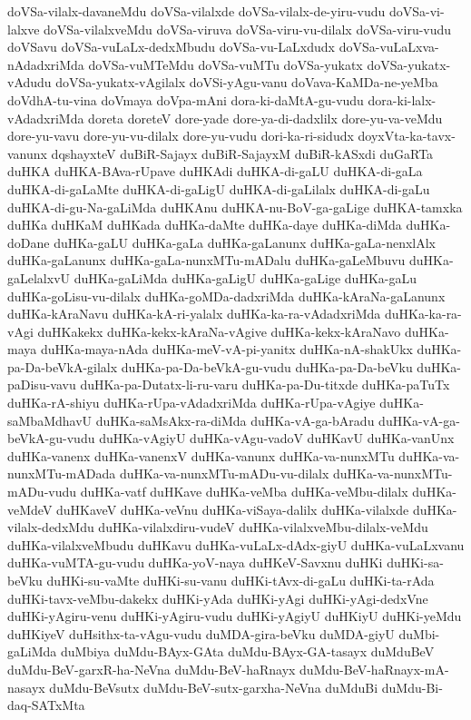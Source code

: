 {doVSa-vilalx-davaneMdu
doVSa-vilalxde
doVSa-vilalx-de-yiru-vudu
doVSa-vi-lalxve
doVSa-vilalxveMdu
doVSa-viruva
doVSa-viru-vu-dilalx
doVSa-viru-vudu
doVSavu
doVSa-vuLaLx-dedxMbudu
doVSa-vu-LaLxdudx
doVSa-vuLaLxva-nAdadxriMda
doVSa-vuMTeMdu
doVSa-vuMTu
doVSa-yukatx
doVSa-yukatx-vAdudu
doVSa-yukatx-vAgilalx
doVSi-yAgu-vanu
doVava-KaMDa-ne-yeMba
doVdhA-tu-vina
doVmaya
doVpa-mAni
dora-ki-daMtA-gu-vudu
dora-ki-lalx-vAdadxriMda
doreta
doreteV
dore-yade
dore-ya-di-dadxlilx
dore-yu-va-veMdu
dore-yu-vavu
dore-yu-vu-dilalx
dore-yu-vudu
dori-ka-ri-sidudx
doyxVta-ka-tavx-vanunx
dqshayxteV
duBiR-Sajayx
duBiR-SajayxM
duBiR-kASxdi
duGaRTa
duHKA
duHKA-BAva-rUpave
duHKAdi
duHKA-di-gaLU
duHKA-di-gaLa
duHKA-di-gaLaMte
duHKA-di-gaLigU
duHKA-di-gaLilalx
duHKA-di-gaLu
duHKA-di-gu-Na-gaLiMda
duHKAnu
duHKA-nu-BoV-ga-gaLige
duHKA-tamxka
duHKa
duHKaM
duHKada
duHKa-daMte
duHKa-daye
duHKa-diMda
duHKa-doDane
duHKa-gaLU
duHKa-gaLa
duHKa-gaLanunx
duHKa-gaLa-nenxlAlx
duHKa-gaLanunx
duHKa-gaLa-nunxMTu-mADalu
duHKa-gaLeMbuvu
duHKa-gaLelalxvU
duHKa-gaLiMda
duHKa-gaLigU
duHKa-gaLige
duHKa-gaLu
duHKa-goLisu-vu-dilalx
duHKa-goMDa-dadxriMda
duHKa-kAraNa-gaLanunx
duHKa-kAraNavu
duHKa-kA-ri-yalalx
duHKa-ka-ra-vAdadxriMda
duHKa-ka-ra-vAgi
duHKakekx
duHKa-kekx-kAraNa-vAgive
duHKa-kekx-kAraNavo
duHKa-maya
duHKa-maya-nAda
duHKa-meV-vA-pi-yanitx
duHKa-nA-shakUkx
duHKa-pa-Da-beVkA-gilalx
duHKa-pa-Da-beVkA-gu-vudu
duHKa-pa-Da-beVku
duHKa-paDisu-vavu
duHKa-pa-Dutatx-li-ru-varu
duHKa-pa-Du-titxde
duHKa-paTuTx
duHKa-rA-shiyu
duHKa-rUpa-vAdadxriMda
duHKa-rUpa-vAgiye
duHKa-saMbaMdhavU
duHKa-saMsAkx-ra-diMda
duHKa-vA-ga-bAradu
duHKa-vA-ga-beVkA-gu-vudu
duHKa-vAgiyU
duHKa-vAgu-vadoV
duHKavU
duHKa-vanUnx
duHKa-vanenx
duHKa-vanenxV
duHKa-vanunx
duHKa-va-nunxMTu
duHKa-va-nunxMTu-mADada
duHKa-va-nunxMTu-mADu-vu-dilalx
duHKa-va-nunxMTu-mADu-vudu
duHKa-vatf
duHKave
duHKa-veMba
duHKa-veMbu-dilalx
duHKa-veMdeV
duHKaveV
duHKa-veVnu
duHKa-viSaya-dalilx
duHKa-vilalxde
duHKa-vilalx-dedxMdu
duHKa-vilalxdiru-vudeV
duHKa-vilalxveMbu-dilalx-veMdu
duHKa-vilalxveMbudu
duHKavu
duHKa-vuLaLx-dAdx-giyU
duHKa-vuLaLxvanu
duHKa-vuMTA-gu-vudu
duHKa-yoV-naya
duHKeV-Savxnu
duHKi
duHKi-sa-beVku
duHKi-su-vaMte
duHKi-su-vanu
duHKi-tAvx-di-gaLu
duHKi-ta-rAda
duHKi-tavx-veMbu-dakekx
duHKi-yAda
duHKi-yAgi
duHKi-yAgi-dedxVne
duHKi-yAgiru-venu
duHKi-yAgiru-vudu
duHKi-yAgiyU
duHKiyU
duHKi-yeMdu
duHKiyeV
duHsithx-ta-vAgu-vudu
duMDA-gira-beVku
duMDA-giyU
duMbi-gaLiMda
duMbiya
duMdu-BAyx-GAta
duMdu-BAyx-GA-tasayx
duMduBeV
duMdu-BeV-garxR-ha-NeVna
duMdu-BeV-haRnayx
duMdu-BeV-haRnayx-mA-nasayx
duMdu-BeVsutx
duMdu-BeV-sutx-garxha-NeVna
duMduBi
duMdu-Bi-daq-SATxMta
}
